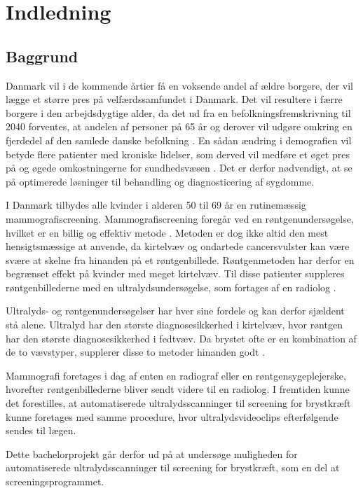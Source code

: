 \chapter{Indledning}
\section{Baggrund}
Danmark vil i de kommende årtier få en voksende andel af ældre borgere, der vil lægge et større pres på velfærdssamfundet i Danmark. Det vil resultere i færre borgere i den arbejdsdygtige alder, da det ud fra en befolkningsfremskrivning til 2040 forventes, at andelen af personer på 65 år og derover vil udgøre omkring en fjerdedel af den samlede danske befolkning \cite{Befolk}. En sådan ændring i demografien vil betyde flere patienter med kroniske lidelser, som derved vil medføre et øget pres på og øgede omkostningerne for sundhedsvæsen \cite{Pres}. Det er derfor nødvendigt, at se på optimerede løsninger til behandling og diagnosticering af sygdomme. 

I Danmark tilbydes alle kvinder i alderen 50 til 69 år en rutinemæssig mammografiscreening. Mammografiscreening foregår ved en røntgenundersøgelse, hvilket er en billig og effektiv metode \cite{Afsloring}. Metoden er dog ikke altid den mest hensigtsmæssige at anvende, da kirtelvæv og ondartede cancersvulster kan være svære at skelne fra hinanden på et røntgenbillede. Røntgenmetoden har derfor en begrænset effekt på kvinder med meget kirtelvæv. Til disse patienter suppleres røntgenbillederne med en ultralydsundersøgelse, som fortages af en radiolog \cite{Ultralyd}.

Ultralyds- og røntgenundersøgelser har hver sine fordele og kan derfor sjældent stå alene. Ultralyd har den største diagnosesikkerhed i kirtelvæv, hvor røntgen har den største diagnosesikkerhed i fedtvæv. Da brystet ofte er en kombination af de to vævstyper, supplerer disse to metoder hinanden godt \cite{Ultralyd}. 

Mammografi foretages i dag af enten en radiograf eller en røntgensygeplejerske, hvorefter røntgenbillederne bliver sendt videre til en radiolog. I fremtiden kunne det forestilles, at automatiserede ultralydsscanninger til screening for brystkræft kunne foretages med samme procedure, hvor ultralydsvideoclips efterfølgende sendes til lægen.

Dette bachelorprojekt går derfor ud på at undersøge muligheden for automatiserede ultralydsscanninger til screening for brystkræft, som en del at screeningsprogrammet.

